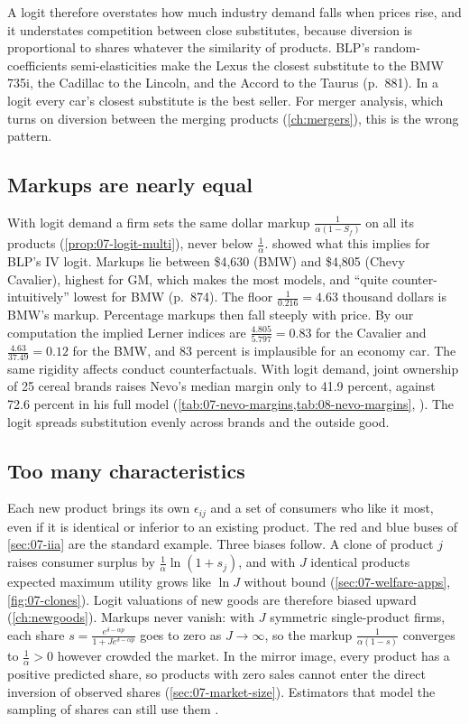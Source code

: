 A logit therefore overstates how much industry demand falls when prices rise, and it understates competition
between close substitutes, because diversion is proportional to shares whatever the similarity of products. BLP's
random-coefficients semi-elasticities make the Lexus the closest substitute to the BMW 735i, the Cadillac to the
Lincoln, and the Accord to the Taurus (p.~881). In a logit every car's closest substitute is the best seller. For
merger analysis, which turns on diversion between the merging products (\cref{ch:mergers}), this is the wrong
pattern.

\subsection{Markups are nearly equal}\label{sec:07-limits-markups}

With logit demand a firm sets the same dollar markup $\frac{1}{\alpha(1 - S_f)}$ on all its products
(\cref{prop:07-logit-multi}), never below $\frac{1}{\alpha}$.  showed what this implies for
BLP's IV logit. Markups lie between \$4,630 (BMW) and \$4,805 (Chevy Cavalier), highest for GM, which makes the most
models, and ``quite counter-intuitively'' lowest for BMW (p.~874). The floor $\frac{1}{0.216} = 4.63$ thousand
dollars is BMW's markup. Percentage markups then fall steeply with price. By our computation the implied Lerner
indices are $\frac{4.805}{5.797} = 0.83$ for the Cavalier and $\frac{4.63}{37.49} = 0.12$ for the BMW, and 83 percent
is implausible for an economy car. The same rigidity affects conduct counterfactuals. With logit demand, joint
ownership of 25 cereal brands raises Nevo's median margin only to 41.9 percent, against 72.6 percent in his full
model (\cref{tab:07-nevo-margins,tab:08-nevo-margins}, \citealp{Nevo2001}). The logit spreads substitution evenly across brands and the
outside good.

\subsection{Too many characteristics}\label{sec:07-limits-epsilon}

Each new product brings its own $\epsilon_{ij}$ and a set of consumers who like it most, even if it is identical
or inferior to an existing product. The red and blue buses of \cref{sec:07-iia} are the standard example. Three biases follow. A
clone of product $j$ raises consumer surplus by $\frac{1}{\alpha}\ln(1 + s_j)$, and with $J$ identical products
expected maximum utility grows like $\ln J$ without bound (\cref{sec:07-welfare-apps}, \cref{fig:07-clones}).
Logit valuations of new goods are therefore biased upward (\cref{ch:newgoods}). Markups never vanish: with $J$ symmetric
single-product firms, each share $s = \frac{e^{\delta - \alpha p}}{1 + Je^{\delta - \alpha p}}$ goes to zero as $J
\to \infty$, so the markup $\frac{1}{\alpha(1-s)}$ converges to $\frac{1}{\alpha} > 0$ however crowded the market.
In the mirror image, every product has a positive predicted share, so products with zero sales cannot enter the
direct inversion of observed shares (\cref{sec:07-market-size}). Estimators that model the sampling of shares can
still use them \citep{GandhiLuShi2023}.

